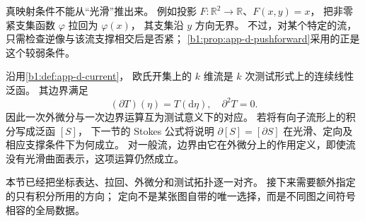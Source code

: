 真映射条件不能从“光滑”推出来。
例如投影 \(F:\mathbb R^2\to\mathbb R\)、\(F(x,y)=x\)，
把非零紧支集函数 \(\varphi\) 拉回为 \(\varphi(x)\)，
其支集沿 \(y\) 方向无界。
不过，对某个特定的流，只需检查逆像与该流支撑相交后是否紧；
\cref{b1:prop:app-d-pushforward}采用的正是这个较弱条件。

\ProseParagraphBreak

沿用\cref{b1:def:app-d-current}，
欧氏开集上的 \(k\) 维流是 \(k\) 次测试形式上的连续线性泛函。
其边界满足
\[
 (\partial T)(\eta)=T(\mathrm d\eta),\quad \partial^2T=0.
\]
因此一次外微分与一次边界运算互为测试意义下的对应。
若将有向子流形上的积分写成泛函 \([S]\)，
下一节的 Stokes 公式将说明 \(\partial[S]=[\partial S]\)
在光滑、定向及相应支撑条件下为何成立。
对一般流，边界由它在外微分上的作用定义，即使流没有光滑曲面表示，这项运算仍然成立。

\ProseParagraphBreak

本节已经把坐标表达、拉回、外微分和测试拓扑逐一对齐。
接下来需要额外指定的只有积分所用的方向；
定向不是某张图自带的唯一选择，而是不同图之间符号相容的全局数据。
